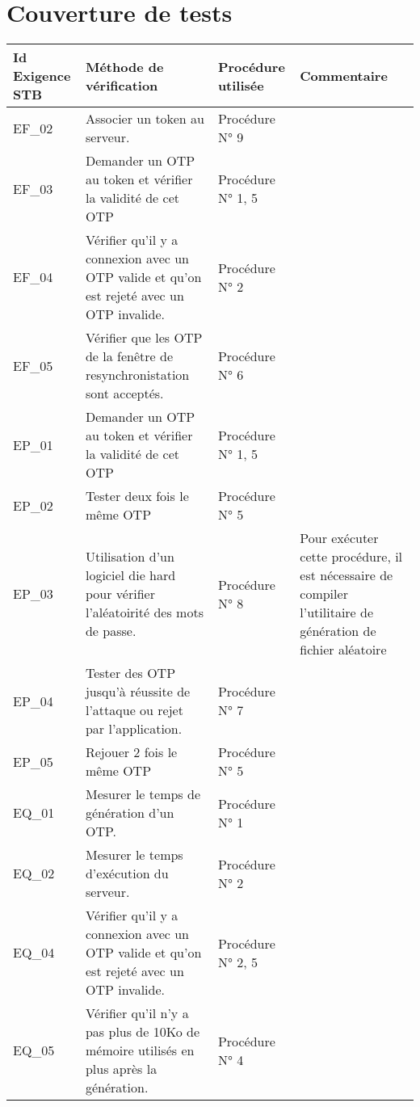\documentclass{"../../res/univ-projet"}
\begin{document}
  \section{Couverture de tests}
  \begin{center}
    \begin{tabular}{|p{2.8cm}|p{4.2cm}|p{3cm}|p{5cm}|}
      \hline
      Id Exigence STB & Méthode de vérification & Procédure utilisée & Commentaire\\ \hline
      EF\_02 & Associer un token au serveur. & Procédure N° 9 & \\ \hline
      EF\_03 & Demander un OTP au token et vérifier la validité de cet OTP & Procédure N° 1, 5 & \\ \hline
      EF\_04 & Vérifier qu'il y a connexion avec un OTP valide et qu'on est rejeté avec un OTP invalide. & Procédure N° 2 & \\ \hline
      EF\_05 & Vérifier que les OTP de la fenêtre de resynchronistation sont acceptés. & Procédure N° 6 & \\ \hline
      EP\_01 & Demander un OTP au token et vérifier la validité de cet OTP & Procédure N° 1, 5 & \\ \hline
      EP\_02 & Tester deux fois le même OTP & Procédure N° 5 & \\ \hline
      EP\_03 & Utilisation d'un logiciel \og{}die hard\fg{} pour vérifier l'aléatoirité des mots de passe. & Procédure 	N° 8 & Pour exécuter cette procédure, il est nécessaire de compiler l'utilitaire de génération de fichier aléatoire\\ \hline
      EP\_04 & Tester des OTP jusqu'à réussite de l'attaque ou rejet par l'application. & Procédure N° 7 & \\ \hline
      EP\_05 & Rejouer 2 fois le même OTP & Procédure N° 5 & \\ \hline
      EQ\_01 & Mesurer le temps de génération d'un OTP. & Procédure N° 1 & \\ \hline
      EQ\_02 & Mesurer le temps d'exécution du serveur. & Procédure N° 2 & \\ \hline
      EQ\_04 & Vérifier qu'il y a connexion avec un OTP valide et qu'on est rejeté avec un OTP invalide. & Procédure N° 2, 5 & \\ \hline
      EQ\_05 & Vérifier qu'il n'y a pas plus de 10Ko de mémoire utilisés en plus après la génération. & Procédure N° 4 & \\ \hline
    \end{tabular}  
  \end{center}
	
\end{document}
